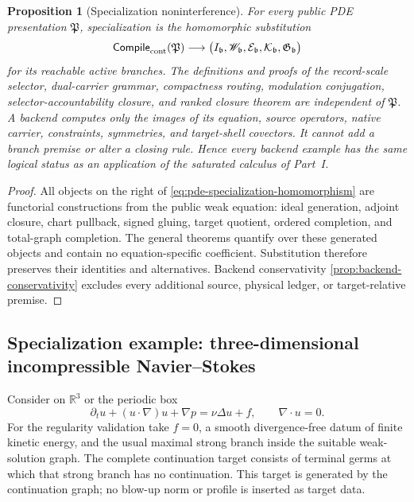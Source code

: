 \documentclass[11pt]{article}
\numberwithin{section}{part}
\theoremstyle{plain}
\newtheorem{proposition}[proposition]{Proposition}
\theoremstyle{definition}
\theoremstyle{remark}
\begin{document}
\begin{proposition}[Specialization noninterference]
\label{prop:specialization-noninterference}
For every public PDE presentation \(\mathfrak P\), specialization is the
homomorphic substitution
\begin{equation}
 \label{eq:pde-specialization-homomorphism}
 \mathsf{Compile}_{\rm cont}(\mathfrak P)
 \longrightarrow
 \bigl(I_{\mathfrak b},\mathscr W_{\mathfrak b},
       \mathcal E_{\mathfrak b},\mathcal K_{\mathfrak b},
       \mathfrak G_{\mathfrak b}\bigr)
\end{equation}
for its reachable active branches.  The definitions and proofs of the
record-scale selector, dual-carrier grammar, compactness routing, modulation
conjugation, selector-accountability closure, and ranked closure theorem are
independent of \(\mathfrak P\).  A backend computes only the images of its
equation, source operators, native carrier, constraints, symmetries, and
target-shell covectors.  It cannot add a branch premise or alter a closing
rule.  Hence every backend example has the same logical status as an
application of the saturated calculus of Part~I.
\end{proposition}

\begin{proof}
All objects on the right of
\eqref{eq:pde-specialization-homomorphism} are functorial constructions from
the public weak equation: ideal generation, adjoint closure, chart pullback,
signed gluing, target quotient, ordered completion, and total-graph
completion.  The general theorems quantify over these generated objects and
contain no equation-specific coefficient.  Substitution therefore preserves
their identities and alternatives.  Backend conservativity
\cref{prop:backend-conservativity} excludes every additional source,
physical ledger, or target-relative premise.
\end{proof}

\subsection{Specialization example: three-dimensional incompressible
Navier--Stokes}

Consider on \(\mathbb R^3\) or the periodic box
\begin{equation}
 \label{eq:ns-public-equation}
 \partial_tu+(u\cdot\nabla)u+\nabla p=\nu\Delta u+f,
 \qquad \nabla\cdot u=0.
\end{equation}
For the regularity validation take \(f=0\), a smooth divergence-free datum of
finite kinetic energy, and the usual maximal strong branch inside the suitable
weak-solution graph.  The complete continuation target consists of terminal
germs at which that strong branch has no continuation.  This target is
generated by the continuation graph; no blow-up norm or profile is inserted
as target data.
\end{document}
